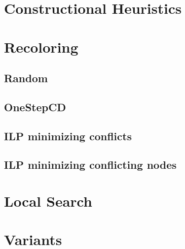 \section{Constructional Heuristics}



\section{Recoloring}\label{sec:recoloring}

\subsection{Random}
\subsection{OneStepCD}
\subsection{ILP minimizing conflicts}
\subsection{ILP minimizing conflicting nodes}


\section{Local Search}


\section{Variants}\label{sec:variants}